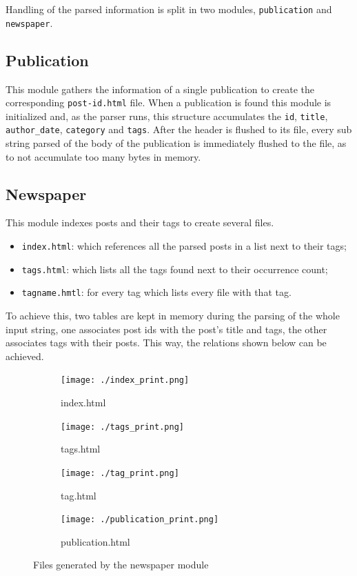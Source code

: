 \documentclass[a4paper]{report}
\begin{document}
Handling of the parsed information is split in two modules,
\texttt{publication} and \texttt{newspaper}.

\subsection{Publication}

This module gathers the information of a single publication to create the
corresponding \texttt{post-id.html} file. When a publication is found this
module is initialized and, as the parser runs, this structure accumulates the
\texttt{id}, \texttt{title}, \texttt{author\_date}, \texttt{category} and
\texttt{tags}. After the header is flushed to its file, every sub
string parsed of the body of the publication is immediately flushed to the file,
as to not accumulate too many bytes in memory.

\subsection{Newspaper}

This module indexes posts and their tags to create several files.
\begin{itemize}
    \item \texttt{index.html}: which references all the parsed posts in
        a list next to their tags;
    \item \texttt{tags.html}: which lists all the tags found next to
        their occurrence count;
    \item \texttt{tagname.hmtl}: for every tag which lists every file with
        that tag.
\end{itemize}

To achieve this, two tables are kept in memory during the parsing of the whole
input string, one associates post ids with the post's title and tags, the other
associates tags with their posts. This way, the relations shown below can be
achieved.

\begin{figure}[H]
    \centering
    \begin{subfigure}{0.54\textwidth}
        \texttt{[image: ./index\_print.png]}
        \caption{index.html}
    \end{subfigure}
    \begin{subfigure}{0.45\textwidth}
        \texttt{[image: ./tags\_print.png]}
        \caption{tags.html}
    \end{subfigure}
    \begin{subfigure}{0.45\textwidth}
        \texttt{[image: ./tag\_print.png]}
        \caption{tag.html}
    \end{subfigure}
    \begin{subfigure}{0.54\textwidth}
        \texttt{[image: ./publication\_print.png]}
        \caption{publication.html}
    \end{subfigure}
    \caption{Files generated by the newspaper module}
\end{figure}
\end{document}
